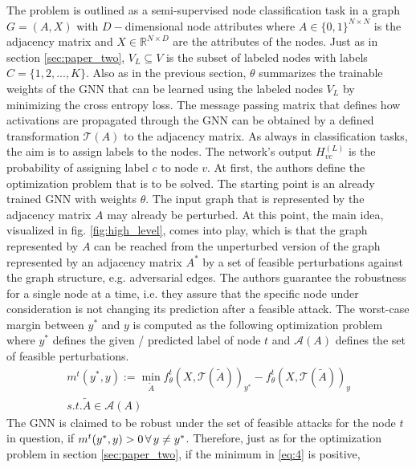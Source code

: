 \documentclass[a4paper,preprint]{sig-alternate}
\begin{document}
The problem is outlined as a semi-supervised node classification task in a graph $G = (A, X)$ with $D-$dimensional node attributes
where $A \in \{0, 1\}^{N \times N}$ is the adjacency matrix and $X \in \mathbb{R}^{N \times D}$ are the attributes of the nodes.
Just as in section \ref{sec:paper_two}, $V_L \subseteq V$ is the subset of labeled nodes with labels $C = \{1, 2, ..., K\}$.
Also as in the previous section, $\theta$ summarizes the trainable weights of the GNN that can be learned using the labeled nodes $V_L$
by minimizing the cross entropy loss. \cite{10.1145/3394486.3403217}
The message passing matrix that defines how activations are propagated through the GNN can be obtained
by a defined transformation $\mathcal{T}(A)$ to the adjacency matrix. \cite{10.1145/3394486.3403217}
As always in classification tasks, the aim is to assign labels to the nodes.
The network's output $H_{vc}^{(L)}$ is the probability of assigning label $c$ to node $v$. \cite{10.1145/3394486.3403217}\newline
At first, the authors define the optimization problem that is to be solved.
The starting point is an already trained GNN with weights $\theta$. The input graph that is represented by the adjacency matrix $A$
may already be perturbed. At this point, the main idea, visualized in fig. \ref{fig:high_level}, comes into play, which is that
the graph represented by $A$ can be reached from the  unperturbed version of the graph represented by an adjacency 
matrix $A^{\ast}$ by a set of feasible perturbations against the graph structure, e.g. adversarial edges. \cite{10.1145/3394486.3403217}
The authors guarantee the robustness for a single node at a time, i.e. they assure that the specific node under 
consideration is not changing its prediction after a feasible attack.
The worst-case margin between $y^{\ast}$ and $y$ is computed as the following optimization problem where $y^{\ast}$ defines the given / predicted 
label of node $t$ and $\mathcal{A}(A)$ defines the set of feasible perturbations.
\begin{gather}
\label{eq:4}
    m^t (y^{\ast}, y) := \min_{\tilde{A}} f_{\theta}^t (X, \mathcal{T}(\tilde{A}))_{y^{\ast}}
    - f_{\theta}^t (X, \mathcal{T}(\tilde{A}))_y \\
    s.t. \tilde{A} \in \mathcal{A}(A) \nonumber
\end{gather}
The GNN is claimed to be robust under the set of feasible attacks for the node $t$ in question,
if $m^t (y^{\ast}, y) > 0 \thinspace \forall \thinspace y \neq y^{\ast}$.
Therefore, just as for the optimization problem in section \ref{sec:paper_two}, if the minimum in \ref{eq:4} is positive, 
\end{document}
